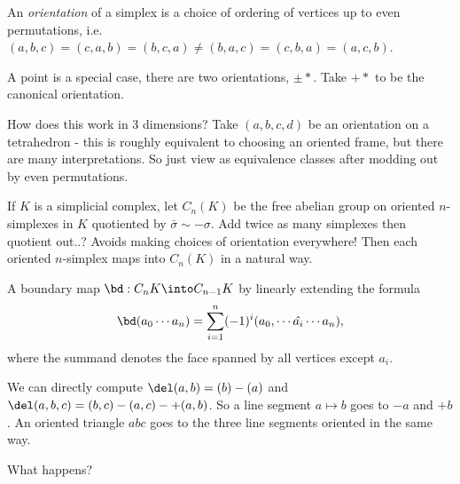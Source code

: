 \begin{definition}

An \emph{orientation} of a simplex is a choice of ordering of vertices
up to even permutations,
i.e.~\((a,b,c) = (c,a,b) = (b,c,a) \neq (b,a,c) = (c,b,a) = (a,c,b)\).

\end{definition}

\begin{example}

A point is a special case, there are two orientations, \(\pm *\). Take
\(+*\) to be the canonical orientation.

\end{example}

\begin{example}

How does this work in 3 dimensions? Take \((a,b,c,d)\) be an orientation
on a tetrahedron - this is roughly equivalent to choosing an oriented
frame, but there are many interpretations. So just view as equivalence
classes after modding out by even permutations.

\end{example}

\begin{definition}[?]

If \(K\) is a simplicial complex, let \(C_n(K)\) be the free abelian
group on oriented \(n\)-simplexes in \(K\) quotiented by
\(\bar\sigma \sim -\sigma\). Add twice as many simplexes then quotient
out..? Avoids making choices of orientation everywhere! Then each
oriented \(n\)-simplex maps into \(C_n(K)\) in a natural way.

\end{definition}

\begin{definition}[?]

A boundary map \(\bd: C_n K \into C_{n-1} K\) by linearly extending the
formula
\begin{align*}
\bd(a_0 \cdots a_n) = \sum_{i=1}^n (-1)^i (a_0, \cdots \hat{a_i} \cdots a_n)
,\end{align*} where the summand denotes the face spanned by all vertices
except \(a_i\).

\end{definition}

\begin{example}

We can directly compute \(\del (a,b) = (b) - (a)\) and
\(\del(a,b,c) = (b,c) - (a,c) -+(a,b)\). So a line segment
\(a \mapsto b\) goes to \(-a\) and \(+b\). An oriented triangle \(abc\)
goes to the three line segments oriented in the same way.

What happens?

\end{example}

